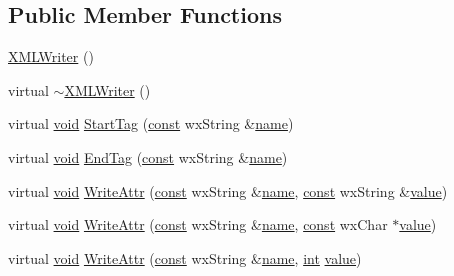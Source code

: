 \subsection*{Public Member Functions}
\begin{DoxyCompactItemize}
\item 
\hyperlink{class_x_m_l_writer_a6d9f7e45eeb60d225c477c138f04d6de}{X\+M\+L\+Writer} ()
\item 
virtual \hyperlink{class_x_m_l_writer_a9c6bf07349c5764a9f7805d83fa4bc6c}{$\sim$\+X\+M\+L\+Writer} ()
\item 
virtual \hyperlink{sound_8c_ae35f5844602719cf66324f4de2a658b3}{void} \hyperlink{class_x_m_l_writer_a38abb8ecc4a15db0272d43ff8bec1369}{Start\+Tag} (\hyperlink{getopt1_8c_a2c212835823e3c54a8ab6d95c652660e}{const} wx\+String \&\hyperlink{lib_2expat_8h_a1b49b495b59f9e73205b69ad1a2965b0}{name})
\item 
virtual \hyperlink{sound_8c_ae35f5844602719cf66324f4de2a658b3}{void} \hyperlink{class_x_m_l_writer_a5c4e63c2c9762b6a04ad4e48bb117678}{End\+Tag} (\hyperlink{getopt1_8c_a2c212835823e3c54a8ab6d95c652660e}{const} wx\+String \&\hyperlink{lib_2expat_8h_a1b49b495b59f9e73205b69ad1a2965b0}{name})
\item 
virtual \hyperlink{sound_8c_ae35f5844602719cf66324f4de2a658b3}{void} \hyperlink{class_x_m_l_writer_a631a2d04a50680a64f0ae48a61d4a4d1}{Write\+Attr} (\hyperlink{getopt1_8c_a2c212835823e3c54a8ab6d95c652660e}{const} wx\+String \&\hyperlink{lib_2expat_8h_a1b49b495b59f9e73205b69ad1a2965b0}{name}, \hyperlink{getopt1_8c_a2c212835823e3c54a8ab6d95c652660e}{const} wx\+String \&\hyperlink{lib_2expat_8h_a4a30a13b813682e68c5b689b45c65971}{value})
\item 
virtual \hyperlink{sound_8c_ae35f5844602719cf66324f4de2a658b3}{void} \hyperlink{class_x_m_l_writer_aded68b61305833fae8d0db4752eae4b4}{Write\+Attr} (\hyperlink{getopt1_8c_a2c212835823e3c54a8ab6d95c652660e}{const} wx\+String \&\hyperlink{lib_2expat_8h_a1b49b495b59f9e73205b69ad1a2965b0}{name}, \hyperlink{getopt1_8c_a2c212835823e3c54a8ab6d95c652660e}{const} wx\+Char $\ast$\hyperlink{lib_2expat_8h_a4a30a13b813682e68c5b689b45c65971}{value})
\item 
virtual \hyperlink{sound_8c_ae35f5844602719cf66324f4de2a658b3}{void} \hyperlink{class_x_m_l_writer_ac76f2cba53b1f6926ebd647e0acd3326}{Write\+Attr} (\hyperlink{getopt1_8c_a2c212835823e3c54a8ab6d95c652660e}{const} wx\+String \&\hyperlink{lib_2expat_8h_a1b49b495b59f9e73205b69ad1a2965b0}{name}, \hyperlink{xmltok_8h_a5a0d4a5641ce434f1d23533f2b2e6653}{int} \hyperlink{lib_2expat_8h_a4a30a13b813682e68c5b689b45c65971}{value})

\end{DoxyCompactItemize}
